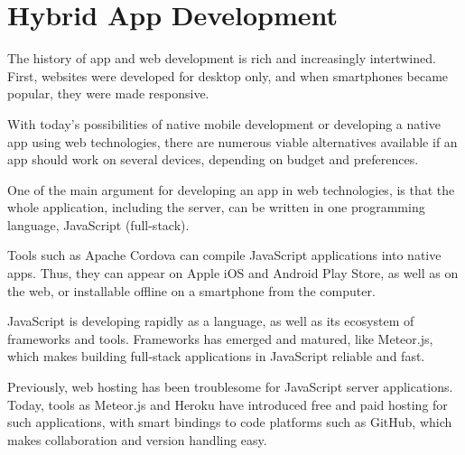 \section{Hybrid App Development}

The history of app and web development is rich and increasingly intertwined. First, websites were developed for desktop only, and when smartphones became popular, they were made responsive.

With today's possibilities of native mobile development or developing a native app using web technologies, there are numerous viable alternatives available if an app should work on several devices, depending on budget and preferences.

One of the main argument for developing an app in web technologies, is that the whole application, including the server, can be written in one programming language, JavaScript (full-stack).

Tools such as Apache Cordova can compile JavaScript applications into native apps. Thus, they can appear on Apple iOS and Android Play Store, as well as on the web, or installable offline on a smartphone from the computer.

JavaScript is developing rapidly as a language, as well as its ecosystem of frameworks and tools. Frameworks has emerged and matured, like Meteor.js, which makes building full-stack applications in JavaScript reliable and fast.

Previously, web hosting has been troublesome for JavaScript server applications. Today, tools as Meteor.js and Heroku have introduced free and paid hosting for such applications, with smart bindings to code platforms such as GitHub, which makes collaboration and version handling easy.

